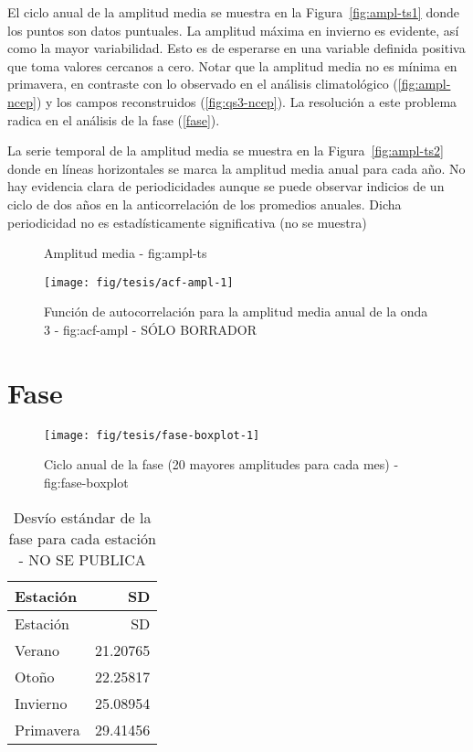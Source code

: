 \documentclass[spanish,a4paper]{book}
\begin{document}
El ciclo anual de la amplitud media se muestra en la
Figura~\ref{fig:ampl-ts1} donde los puntos son datos puntuales. La
amplitud máxima en invierno es evidente, así como la mayor variabilidad.
Esto es de esperarse en una variable definida positiva que toma valores
cercanos a cero. Notar que la amplitud media no es mínima en primavera,
en contraste con lo observado en el análisis climatológico
(\autoref{fig:ampl-ncep}) y los campos reconstruidos
(\autoref{fig:qs3-ncep}). La resolución a este problema radica en el
análisis de la fase (\autoref{fase}).

La serie temporal de la amplitud media se muestra en la
Figura~\ref{fig:ampl-ts2} donde en líneas horizontales se marca la
amplitud media anual para cada año. No hay evidencia clara de
periodicidades aunque se puede observar indicios de un ciclo de dos años
en la anticorrelación de los promedios anuales. Dicha periodicidad no es
estadísticamente significativa (no se muestra)

\begin{figure*}
\newline{}\caption{Amplitud media - fig:ampl-ts}\label{fig:ampl-ts}
\end{figure*}

\begin{figure}
\texttt{[image: fig/tesis/acf-ampl-1]} \caption{Función de autocorrelación para la amplitud media anual de la onda 3 - fig:acf-ampl - SÓLO BORRADOR}\label{fig:acf-ampl}
\end{figure}

\section{Fase}\label{fase}

\begin{figure}
\texttt{[image: fig/tesis/fase-boxplot-1]} \caption{Ciclo anual de la fase (20 mayores amplitudes para cada mes) - fig:fase-boxplot}\label{fig:fase-boxplot}
\end{figure}

\begin{longtable}[]{@{}lr@{}}
\caption{Desvío estándar de la fase para cada estación - NO SE
PUBLICA}\tabularnewline
\toprule
Estación & SD\tabularnewline
\midrule
\endfirsthead
\toprule
Estación & SD\tabularnewline
\midrule
\endhead
Verano & 21.20765\tabularnewline
Otoño & 22.25817\tabularnewline
Invierno & 25.08954\tabularnewline
Primavera & 29.41456\tabularnewline
\bottomrule
\end{longtable}
\end{document}
